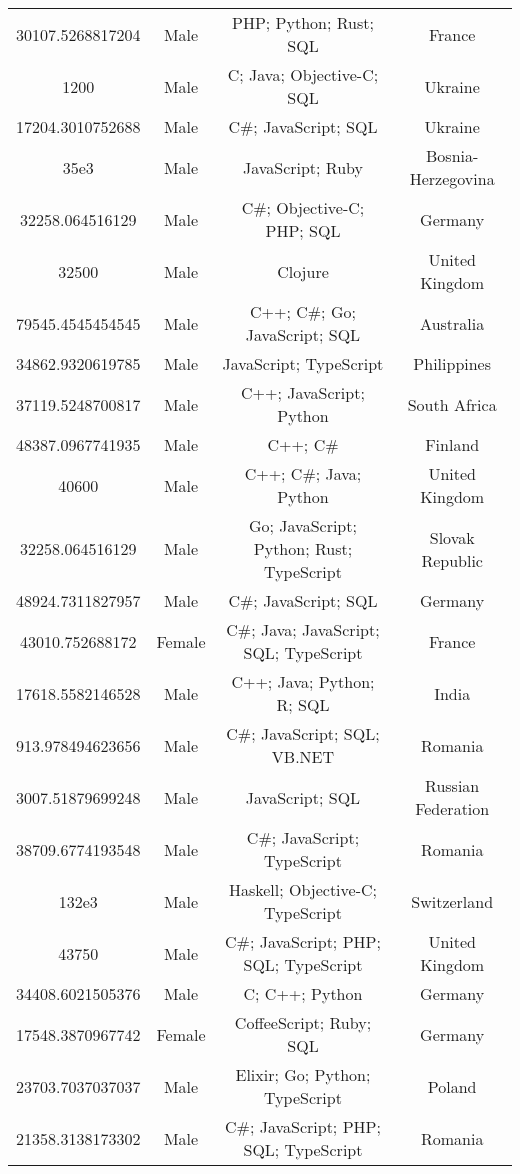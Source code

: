 \begin{center}
\begin{tabular}{ |c|c|c|c| }
30107.5268817204  &  Male  &  PHP; Python; Rust; SQL  &  France  \\ 
1200  &  Male  &  C; Java; Objective-C; SQL  &  Ukraine  \\ 
17204.3010752688  &  Male  &  C\#; JavaScript; SQL  &  Ukraine  \\ 
35e3  &  Male  &  JavaScript; Ruby  &  Bosnia-Herzegovina  \\ 
32258.064516129  &  Male  &  C\#; Objective-C; PHP; SQL  &  Germany  \\ 
32500  &  Male  &  Clojure  &  United Kingdom  \\ 
79545.4545454545  &  Male  &  C++; C\#; Go; JavaScript; SQL  &  Australia  \\ 
34862.9320619785  &  Male  &  JavaScript; TypeScript  &  Philippines  \\ 
37119.5248700817  &  Male  &  C++; JavaScript; Python  &  South Africa  \\ 
48387.0967741935  &  Male  &  C++; C\#  &  Finland  \\ 
40600  &  Male  &  C++; C\#; Java; Python  &  United Kingdom  \\ 
32258.064516129  &  Male  &  Go; JavaScript; Python; Rust; TypeScript  &  Slovak Republic  \\ 
48924.7311827957  &  Male  &  C\#; JavaScript; SQL  &  Germany  \\ 
43010.752688172  &  Female  &  C\#; Java; JavaScript; SQL; TypeScript  &  France  \\ 
17618.5582146528  &  Male  &  C++; Java; Python; R; SQL  &  India  \\ 
913.978494623656  &  Male  &  C\#; JavaScript; SQL; VB.NET  &  Romania  \\ 
3007.51879699248  &  Male  &  JavaScript; SQL  &  Russian Federation  \\ 
38709.6774193548  &  Male  &  C\#; JavaScript; TypeScript  &  Romania  \\ 
132e3  &  Male  &  Haskell; Objective-C; TypeScript  &  Switzerland  \\ 
43750  &  Male  &  C\#; JavaScript; PHP; SQL; TypeScript  &  United Kingdom  \\ 
34408.6021505376  &  Male  &  C; C++; Python  &  Germany  \\ 
17548.3870967742  &  Female  &  CoffeeScript; Ruby; SQL  &  Germany  \\ 
23703.7037037037  &  Male  &  Elixir; Go; Python; TypeScript  &  Poland  \\ 
21358.3138173302  &  Male  &  C\#; JavaScript; PHP; SQL; TypeScript  &  Romania  \\ 

\end{tabular}
\end{center}
